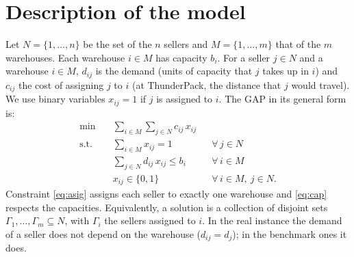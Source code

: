 \documentclass[11pt,a4paper]{article}
\begin{document}
\section{Description of the model}
Let $N=\{1,\dots,n\}$ be the set of the $n$ sellers and $M=\{1,\dots,m\}$ that of the $m$
warehouses. Each warehouse $i\in M$ has capacity $b_i$. For a seller $j\in N$ and a warehouse
$i\in M$, $d_{ij}$ is the demand (units of capacity that $j$ takes up in $i$) and $c_{ij}$ the cost
of assigning $j$ to $i$ (at ThunderPack, the distance that $j$ would travel). We use binary
variables $x_{ij}=1$ if $j$ is assigned to $i$. The GAP in its general form is:
\begin{align}
  \min \quad & \sum_{i\in M}\sum_{j\in N} c_{ij}\,x_{ij} \label{eq:obj}\\
  \text{s.t.}\quad & \sum_{i\in M} x_{ij} = 1 && \forall\, j\in N \label{eq:asig}\\
  & \sum_{j\in N} d_{ij}\,x_{ij} \le b_i && \forall\, i\in M \label{eq:cap}\\
  & x_{ij}\in\{0,1\} && \forall\, i\in M,\ j\in N. \nonumber
\end{align}
Constraint \eqref{eq:asig} assigns each seller to exactly one warehouse and \eqref{eq:cap}
respects the capacities. Equivalently, a solution is a collection of disjoint sets
$\Gamma_1,\dots,\Gamma_m\subseteq N$, with $\Gamma_i$ the sellers assigned to $i$. In the real
instance the demand of a seller does not depend on the warehouse ($d_{ij}=d_j$); in the benchmark
ones it does.
\end{document}
